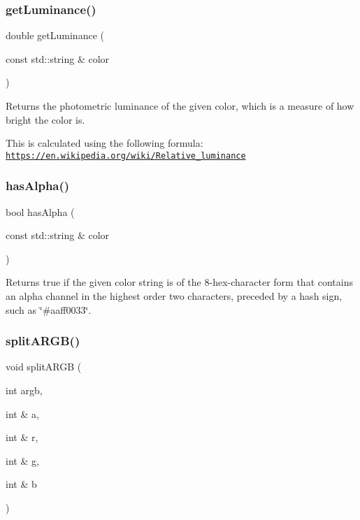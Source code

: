 \subsubsection{\texorpdfstring{get\+Luminance()}{getLuminance()}\hspace{0.1cm}{\footnotesize\ttfamily [2/2]}}
{\footnotesize\ttfamily double get\+Luminance (\begin{DoxyParamCaption}\item[{const std\+::string \&}]{color }\end{DoxyParamCaption})\hspace{0.3cm}{\ttfamily [static]}}



Returns the photometric luminance of the given color, which is a measure of how bright the color is. 

This is calculated using the following formula\+: \href{https://en.wikipedia.org/wiki/Relative_luminance}{\tt https\+://en.\+wikipedia.\+org/wiki/\+Relative\+\_\+luminance} \mbox{\label{classGColor_ac3793cbac78369b75b4d8967d8cb2b7a}} 
\subsubsection{\texorpdfstring{has\+Alpha()}{hasAlpha()}}
{\footnotesize\ttfamily bool has\+Alpha (\begin{DoxyParamCaption}\item[{const std\+::string \&}]{color }\end{DoxyParamCaption})\hspace{0.3cm}{\ttfamily [static]}}



Returns true if the given color string is of the 8-\/hex-\/character form that contains an alpha channel in the highest order two characters, preceded by a hash sign, such as \char`\"{}\#aaff0033\char`\"{}. 

\mbox{\label{classGColor_aa0ad89394f00240bdc0ec3b893eca6aa}} 
\subsubsection{\texorpdfstring{split\+A\+R\+G\+B()}{splitARGB()}}
{\footnotesize\ttfamily void split\+A\+R\+GB (\begin{DoxyParamCaption}\item[{int}]{argb,  }\item[{int \&}]{a,  }\item[{int \&}]{r,  }\item[{int \&}]{g,  }\item[{int \&}]{b }\end{DoxyParamCaption})\hspace{0.3cm}{\ttfamily [static]}}



